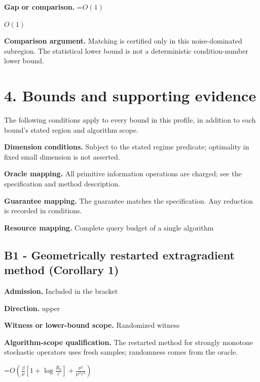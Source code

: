 \documentclass[10pt,a4paper]{article}
\newcommand{\AtlasMath}[1]{\par\begingroup\centering\setbox0=\hbox{$\displaystyle #1$}\ifdim\wd0>1.4\linewidth\typeout{ATLAS WIDE FORMULA: \the\wd0}\fi\ifdim\wd0>\linewidth\resizebox{\linewidth}{!}{\box0}\else\box0\fi\par\endgroup}
\newcommand{\AtlasInlineMath}[1]{\begingroup\setbox0=\hbox{$#1$}\ifdim\wd0>.4\linewidth\endgroup\AtlasMath{#1}\else\endgroup$#1$\fi}
\begin{document}
\textbf{Gap or comparison.} \AtlasInlineMath{O(1)}



\textbf{Comparison argument.} Matching is certified only in this noise-dominated subregion. The statistical lower bound is not a deterministic condition-number lower bound.



\section{4. Bounds and supporting evidence}


The following conditions apply to every bound in this profile, in addition to each bound's stated region and algorithm scope.



\textbf{Dimension conditions.} Subject to the stated regime predicate; optimality in fixed small dimension is not asserted.



\textbf{Oracle mapping.} All primitive information operations are charged; see the specification and method description.



\textbf{Guarantee mapping.} The guarantee matches the specification. Any reduction is recorded in conditions.



\textbf{Resource mapping.} Complete query budget of a single algorithm



\subsection{B1 - Geometrically restarted extragradient method (Corollary 1)}


\textbf{Admission.} Included in the bracket



\textbf{Direction.} upper



\textbf{Witness or lower-bound scope.} Randomized witness



\textbf{Algorithm-scope qualification.} The restarted method for strongly monotone stochastic operators uses fresh samples; randomness comes from the oracle.



\AtlasMath{O\!\left(\frac{\beta}{\mu}\left[1+\log\frac{R_0}{\varepsilon}\right]+\frac{\sigma^2}{\mu^2\varepsilon^2}\right)}
\end{document}
